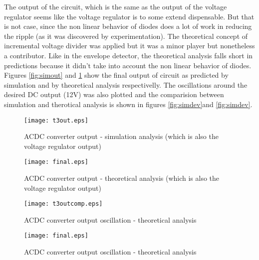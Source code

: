 The output of the circuit, which is the same as the output of the voltage regulator seems like the voltage regulator is to some extend dispensable. But that is not case, since the non linear behavior of diodes does a lot of work in reducing the ripple (as it was discovered by experimentation). The theoretical concept of incremental voltage divider was applied but it was a minor player but nonetheless a contributor. Like in the envelope detector, the theoretical analysis falls short in predictions because it didn't take into account the non linear behavior of diodes. Figures \ref{fig:simout} and \ref{fig:compout} show the final output of circuit as predicted by simulation and by theoretical analysis respectivelly. The oscillations around the desired DC output (12V) was also plotted and the comparision between simulation and therotical analysis is shown in figures \ref{fig:simdev}and  \ref{fig:simdev}.




\begin{figure}[h] \centering
  \begin{minipage}{.45\textwidth}
    \texttt{[image: t3out.eps]}
    \caption{ACDC converter output - simulation analysis (which is also the voltage regulator output)}
    \label{fig:simout}
  \end{minipage}%
  \hspace{2 mm}
  \begin{minipage}{.45\textwidth}
  \centering
    \texttt{[image: final.eps]}
    \caption{ACDC converter output - theoretical analysis (which is also the voltage regulator output)}
    \label{fig:compout}
      \end{minipage}%
\end{figure}

\begin{figure}[h] \centering
  \begin{minipage}{.45\textwidth}
    \texttt{[image: t3outcomp.eps]}
    \caption{ACDC converter output oscillation - theoretical analysis}
    \label{fig:simdev}
  \end{minipage}%
    \hspace{2 mm}
  \begin{minipage}{.45\textwidth}
  \centering
    \texttt{[image: final.eps]}
    \caption{ACDC converter output oscillation - theoretical analysis}
    \label{fig:compdev}
      \end{minipage}%
\end{figure}

